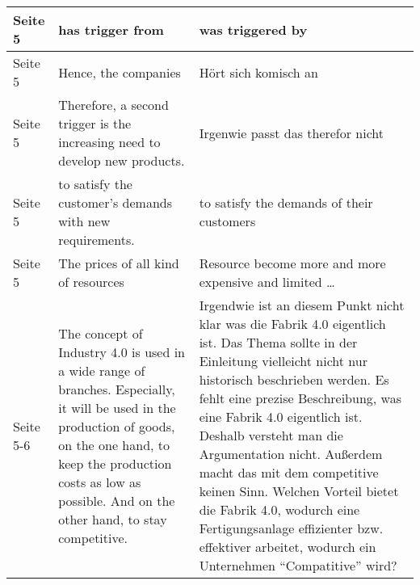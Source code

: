 \documentclass{article}
\begin{document}
\begin{tabularx}{\textwidth}{|l|X|X|}
    \hline
    Seite 5 & has trigger from & was triggered by\\
    \hline
    Seite 5 & Hence, the companies & Hört sich komisch an\\
    \hline
    Seite 5 & Therefore, a second trigger is the increasing need to develop new products. & Irgenwie passt das therefor nicht\\
    \hline
    Seite 5 & to satisfy the customer’s demands with new requirements. & to satisfy the demands of their customers\\
    \hline
    Seite 5 & The prices of all kind of resources & Resource become more and more expensive and limited \ldots \\
    \hline
    Seite 5-6 & The concept of Industry 4.0 is used in a wide range of branches. Especially, it will be
    used in the production of goods, on the one hand, to keep the production costs as low as possible. And on the other hand, to stay competitive. &
    Irgendwie ist an diesem Punkt nicht klar was die Fabrik 4.0 eigentlich ist. Das Thema sollte in der Einleitung vielleicht nicht nur historisch beschrieben werden. Es fehlt eine prezise Beschreibung, was eine Fabrik 4.0 eigentlich ist. Deshalb versteht man die Argumentation nicht. Außerdem macht das mit dem competitive keinen Sinn. Welchen Vorteil bietet die Fabrik 4.0, wodurch eine Fertigungsanlage effizienter bzw. effektiver arbeitet, wodurch ein Unternehmen \enquote{Compatitive} wird?\\


\end{tabularx}
\end{document}
